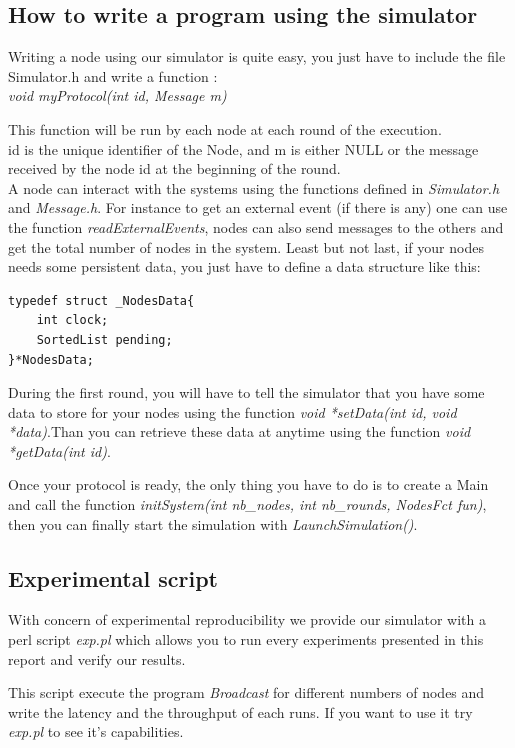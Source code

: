 \documentclass[a4paper]{article}
\begin{document}
\subsection{How to write a program using the simulator}
Writing a node using our simulator is quite easy, you just have to 
include the file Simulator.h and write a function :\\
\textit{void myProtocol(int id, Message m)}

This function will be run by each node at each round of the execution.\\
id is the unique identifier of the Node, and m is either NULL or the
message received by the node id at the beginning of the round.\\
A node can interact with the systems using the functions defined in
\textit{Simulator.h} and \textit{Message.h}. For instance to get an external event
(if there is any) one can use the function \textit{readExternalEvents},
nodes can also send messages to the others and get the total number of
nodes in the system. Least but not last, if your nodes needs some
persistent data, you just have to define a data structure like this:\\
\begin{verbatim}
typedef struct _NodesData{
    int clock;
    SortedList pending;
}*NodesData;
\end{verbatim}
During the first round, you will have to tell the simulator that you
have some data to store for your nodes using the function \textit{void *setData(int id,
void *data)}.Than you can retrieve these data at anytime using the function
\textit{void *getData(int id)}.

Once your protocol is ready, the only thing you have to do is to create
a Main and call the function \textit{initSystem(int nb\_nodes, int
nb\_rounds, NodesFct fun)}, then you can finally start the simulation
with \textit{LaunchSimulation()}. 
\subsection{Experimental script}
With concern of experimental reproducibility we provide our simulator with a
perl script \textit{exp.pl} which allows you to run every experiments
presented in this report and verify our results.

This script execute the program \textit{Broadcast} for different numbers of
nodes and write the latency and the throughput of each runs. If you want to use
it try \textit{exp.pl} to see it's capabilities.
\end{document}
